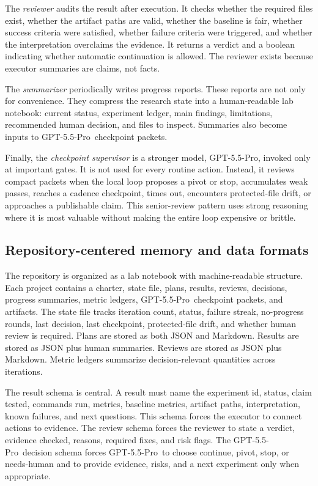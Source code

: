 \documentclass{article}
\newcommand{\gptpro}{GPT-5.5-Pro}
\begin{document}
The \emph{reviewer} audits the result after execution. It checks whether the required files exist, whether the artifact paths are valid, whether the baseline is fair, whether success criteria were satisfied, whether failure criteria were triggered, and whether the interpretation overclaims the evidence. It returns a verdict and a boolean indicating whether automatic continuation is allowed. The reviewer exists because executor summaries are claims, not facts.

The \emph{summarizer} periodically writes progress reports. These reports are not only for convenience. They compress the research state into a human-readable lab notebook: current status, experiment ledger, main findings, limitations, recommended human decision, and files to inspect. Summaries also become inputs to \gptpro\ checkpoint packets.

Finally, the \emph{checkpoint supervisor} is a stronger model, \gptpro, invoked only at important gates. It is not used for every routine action. Instead, it reviews compact packets when the local loop proposes a pivot or stop, accumulates weak passes, reaches a cadence checkpoint, times out, encounters protected-file drift, or approaches a publishable claim. This senior-review pattern uses strong reasoning where it is most valuable without making the entire loop expensive or brittle.

\subsection{Repository-centered memory and data formats}

The repository is organized as a lab notebook with machine-readable structure. Each project contains a charter, state file, plans, results, reviews, decisions, progress summaries, metric ledgers, \gptpro\ checkpoint packets, and artifacts. The state file tracks iteration count, status, failure streak, no-progress rounds, last decision, last checkpoint, protected-file drift, and whether human review is required. Plans are stored as both JSON and Markdown. Results are stored as JSON plus human summaries. Reviews are stored as JSON plus Markdown. Metric ledgers summarize decision-relevant quantities across iterations.

The result schema is central. A result must name the experiment id, status, claim tested, commands run, metrics, baseline metrics, artifact paths, interpretation, known failures, and next questions. This schema forces the executor to connect actions to evidence. The review schema forces the reviewer to state a verdict, evidence checked, reasons, required fixes, and risk flags. The \gptpro\ decision schema forces \gptpro\ to choose continue, pivot, stop, or needs-human and to provide evidence, risks, and a next experiment only when appropriate.
\end{document}
